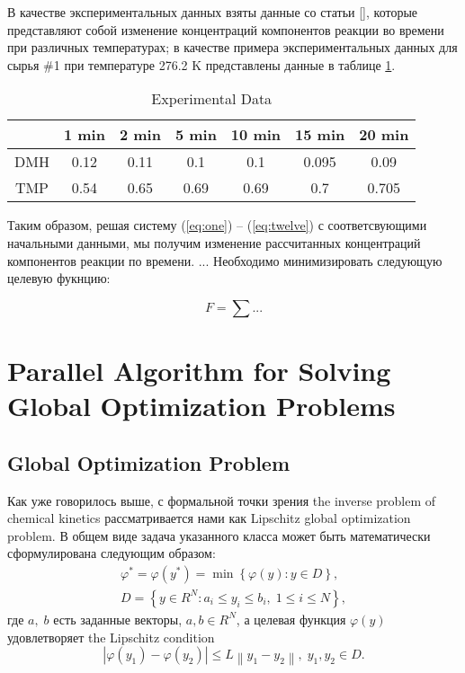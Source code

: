 \documentclass{svproc}
\begin{document}
В качестве экспериментальных данных взяты данные со статьи [], которые представляют собой изменение концентраций компонентов реакции во времени при различных температурах; в качестве примера экспериментальных данных для сырья \#1 при температуре 276.2 K представлены данные в таблице \ref{table1}.

\begin{table}
\label{table1}
\caption{Experimental Data}
\begin{center}
\begin{tabular}{ccccccc}
\hline
& 1 min & 2 min & 5 min & 10 min & 15 min & 20 min  \\
\hline\rule{0pt}{12pt}
DMH & 0.12 & 0.11 & 0.1	& 0.1 &	0.095 &	0.09  \\
TMP & 0.54 & 0.65 & 0.69 & 0.69 & 0.7 & 0.705 \\[2pt]
\hline
\end{tabular}
\end{center}
\end{table}

Таким образом, решая систему (\ref{eq:one}) -- (\ref{eq:twelve}) с соответсвующими начальными данными, мы получим изменение рассчитанных концентраций компонентов реакции по времени. ...
Необходимо минимизировать следующую целевую фукнцию:

\begin{equation}
  F = \sum ...
  \label{eq:objective_func}
\end{equation}


\section{Parallel Algorithm for Solving Global Optimization Problems }\label{Sec_GSA}

\subsection{Global Optimization Problem}

Как уже говорилось выше, с формальной точки зрения the inverse problem of chemical kinetics рассматривается нами как Lipschitz global optimization problem. 
В общем виде задача указанного класса может быть математически сформулирована следующим образом:
\begin{gather}
 \varphi^* = \varphi(y^\ast)=\min{\left\{\varphi(y):y\in D\right\}}, \label{problemN}\\
 D=\left\{y\in R^N: a_i\leq y_i \leq b_i, \;  1\leq i \leq N\right\} \label{D},
\end{gather}
где $a,\; b$ есть заданные векторы, $a,b\in R^N$, а целевая функция $\varphi(y)$ удовлетворяет the Lipschitz condition
\begin{equation}\label{Lip}
\left|\varphi(y_1)-\varphi(y_2)\right|\leq L\left\|y_1-y_2\right\|,\; y_1,y_2 \in D.
\end{equation}
\end{document}
